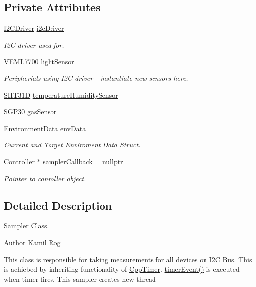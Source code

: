 \subsection*{Private Attributes}
\begin{DoxyCompactItemize}
\item 
\hyperlink{classI2CDriver}{I2\+C\+Driver} \hyperlink{classSampler_ada5598060be79a005bf4375fcbf9773d}{i2c\+Driver}
\begin{DoxyCompactList}\small\item\em I2C driver used for. \end{DoxyCompactList}\item 
\hyperlink{classVEML7700}{V\+E\+M\+L7700} \hyperlink{classSampler_ae81394f464670af514f8dc7c5df46d74}{light\+Sensor}
\begin{DoxyCompactList}\small\item\em Peripherials using I2C driver -\/ instantiate new sensors here. \end{DoxyCompactList}\item 
\hyperlink{classSHT31D}{S\+H\+T31D} \hyperlink{classSampler_aad073931f59004109e8050c669b294c0}{temperature\+Humidity\+Sensor}
\item 
\hyperlink{classSGP30}{S\+G\+P30} \hyperlink{classSampler_a4af78e46617fc8cdbc4bd14a7db5c741}{gas\+Sensor}
\item 
\hyperlink{structEnvironmentData}{Environment\+Data} \hyperlink{classSampler_a4cfbeb66e1cd18cfc66ccdb2712770f9}{env\+Data}
\begin{DoxyCompactList}\small\item\em Current and Target Enviroment Data Struct. \end{DoxyCompactList}\item 
\hyperlink{classController}{Controller} $\ast$ \hyperlink{classSampler_a3a37b5d667134d905e4bda45974cb936}{sampler\+Callback} = nullptr
\begin{DoxyCompactList}\small\item\em Pointer to conroller object. \end{DoxyCompactList}\end{DoxyCompactItemize}


\subsection{Detailed Description}
\hyperlink{classSampler}{Sampler} Class. 

\begin{DoxyAuthor}{Author}
Kamil Rog
\end{DoxyAuthor}
This class is responsible for taking measurements for all devices on I2C Bus. This is achiebed by inheriting functionality of \hyperlink{classCppTimer}{Cpp\+Timer}. \hyperlink{classSampler_addf333c6e247ee3a1def41260caa902a}{timer\+Event()} is executed when timer fires. This sampler creates new thread 

